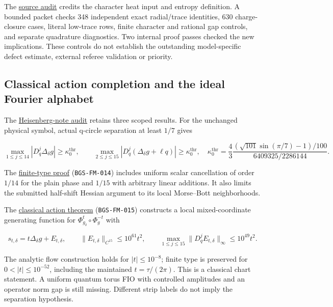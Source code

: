 The \href{https://github.com/ChurilovMaksim/BGS/blob/main/literature/noise_removal_sources_20261005.md}{source audit}
credits the character heat input and entropy definition. A bounded packet
checks 348 independent exact radial/trace identities, 630 charge-closure
cases, literal low-trace rows, finite character and rational gap controls,
and separate quadrature diagnostics. Two internal proof passes checked
the new implications. These controls do not establish the outstanding
model-specific defect estimate, external referee validation or priority.

\hypertarget{classical-action-completion-and-the-ideal-fourier-alphabet}{%
\subsection{Classical action completion and the ideal Fourier alphabet}\label{classical-action-completion-and-the-ideal-fourier-alphabet}}

The \href{https://github.com/ChurilovMaksim/BGS/blob/main/record/heisenberg_note_review_20260930.md}{Heisenberg-note audit}
retains three scoped results. For the unchanged physical symbol, actual
q-circle separation at least \(1/7\) gives

\[
\max_{1\le j\le14}|D_q^j\Delta_\delta g|\ge\kappa_0^{\mathrm{thr}},\qquad
\max_{2\le j\le15}|D_q^j(\Delta_\delta g+\ell q)|\ge\kappa_0^{\mathrm{thr}},
\quad \kappa_0^{\mathrm{thr}}=\frac{4}{3}\frac{(\sqrt{101}\sin(\pi/7)-1)/100}
{6409325/2286144}.
\]

The \href{https://github.com/ChurilovMaksim/BGS/blob/main/mathematics/frozen_phase_finite_type.md}{finite-type proof} (\texttt{BGS-FM-014})
includes uniform scalar cancellation of order \(1/14\) for the plain phase
and \(1/15\) with arbitrary linear additions. It also limits the submitted
half-shift Hessian argument to its local Morse--Bott neighborhoods.

The \href{https://github.com/ChurilovMaksim/BGS/blob/main/mathematics/frozen_commutator_action.md}{classical action theorem} (\texttt{BGS-FM-015})
constructs a local mixed-coordinate generating function for
\(\Phi_{g_\delta}^t\circ\Phi_g^{-t}\) with

\[
s_{t,\delta}=t\Delta_\delta g+E_{t,\delta},\qquad
\|E_{t,\delta}\|_{C^{15}}\le10^{61}t^2,\qquad
\max_{1\le j\le15}\|D_q^jE_{t,\delta}\|_\infty\le10^{49}t^2.
\]

The analytic flow construction holds for \(|t|\le10^{-8}\); finite type
is preserved for \(0<|t|\le10^{-52}\), including the maintained
\(t=\tau/(2\pi)\). This is a classical chart statement. A uniform quantum
torus FIO with controlled amplitudes and an operator norm gap is still
missing. Different strip labels do not imply the separation hypothesis.

